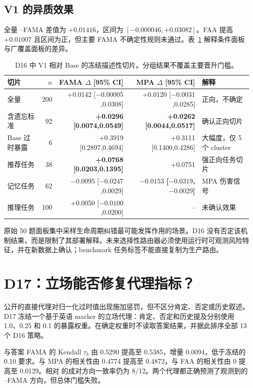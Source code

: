 \subsection{V1 的异质效果}

全量 \vone--\base FAMA 差值为 $+0.01416$，区间为 $[-0.000046,+0.03082]$。FAA 提高 $+0.01007$ 且区间为正，但主要 FAMA 不确定性规则未通过。表~\ref{tab:subgroups} 解释条件面板与广覆盖面板的差异。

\begin{table}[H]
\centering
\footnotesize
\begin{tabular}{lrrrl}
\toprule
切片 & $n$ & FAMA $\Delta$ [95\% CI] & MPA $\Delta$ [95\% CI] & 解释 \\
\midrule
全量 & 200 & +0.0142 [$-0.00005$,0.0308] & +0.0120 [$-0.0031$,0.0285] & 正向，不确定 \\
含遗忘标准 & 92 & \textbf{+0.0296 [0.0074,0.0549]} & \textbf{+0.0262 [0.0044,0.0517]} & 确认正向切片 \\
Base 过时暴露 & 6 & +0.3919 [0.2897,0.4694] & +0.3111 [0.1400,0.4286] & 大幅度，仅 5 个 cluster \\
推荐任务 & 38 & \textbf{+0.0768 [0.0203,0.1395]} & +0.0751 & 强正向任务切片 \\
记忆任务 & 62 & $-0.0095$ [$-0.0247$,0.0029] & \textbf{$-0.0153$ [$-0.0319$,$-0.0029$]} & MPA 伤害信号 \\
推理任务 & 100 & +0.0050 [$-0.0100$,0.0200] & -- & 未确认效果 \\
\bottomrule
\end{tabular}
\caption{D16 中 V1 相对 Base 的冻结描述性切片。分组结果不覆盖主要晋升门槛。}
\label{tab:subgroups}
\end{table}

原始 50 题面板集中采样生命周期纠错最可能发挥作用的场景。D16 没有否定该机制结果，而是限制了其部署解释。未来选择性路由器必须使用运行时可观测风险特征，并在新数据上确认；benchmark 任务标签不能直接复制为生产路由。

\section{D17：立场能否修复代理指标？}

公开的直接代理对归一化过时值出现施加惩罚，但不区分肯定、否定或历史叙述。D17 冻结一个基于英语 marker 的立场代理：肯定、否定和历史提及分别使用 1.0、0.25 和 0.1 的暴露权重。在确定权重时不读取答案结果，并据此排序全部 13 个 D16 策略。

与答案 FAMA 的 Kendall $\tau_b$ 由 0.5290 提高至 0.5385，增量 0.0094，低于冻结的 0.10 要求。与 MPA 的相关性由 0.4774 提高至 0.4872，与 FAA 的相关性由 0 提高至 0.0129。相对 \vone 的成对方向一致率仍为 8/12。两个代理都正确预测了观测到的 \vtwo--\vone FAMA 方向，但总体门槛失败。

